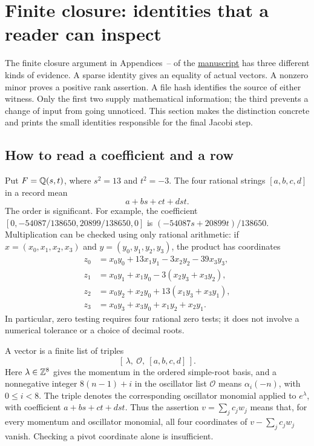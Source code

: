 \section{Finite closure: identities that a reader can inspect}
\label{sec:reader-finite}

The finite closure argument in Appendices~-- of the
\href{hi_cft_c8_proof.pdf}{manuscript} has three different kinds of
evidence.  A sparse identity gives an equality of actual vectors.  A
nonzero minor proves a positive rank assertion.  A file hash identifies
the source of either witness.  Only the first two supply mathematical
information; the third prevents a change of input from going unnoticed.
This section makes the distinction concrete and prints the small
identities responsible for the final Jacobi step.

\subsection{How to read a coefficient and a row}

Put $F=\mathbb Q(s,t)$, where $s^2=13$ and $t^2=-3$.  The four rational
strings $[a,b,c,d]$ in a record mean
\[
                  a+bs+ct+dst.
\]
The order is significant.  For example, the coefficient
$[0,-54087/138650,20899/138650,0]$ is
$(-54087s+20899t)/138650$.  Multiplication can be checked using
only rational arithmetic: if $x=(x_0,x_1,x_2,x_3)$ and
$y=(y_0,y_1,y_2,y_3)$, the product has coordinates
\begin{align*}
z_0&=x_0y_0+13x_1y_1-3x_2y_2-39x_3y_3,\\
z_1&=x_0y_1+x_1y_0-3(x_2y_3+x_3y_2),\\
z_2&=x_0y_2+x_2y_0+13(x_1y_3+x_3y_1),\\
z_3&=x_0y_3+x_3y_0+x_1y_2+x_2y_1.
\end{align*}
In particular, zero testing requires four rational zero tests; it
does not involve a numerical tolerance or a choice of decimal roots.

A vector is a finite list of triples
\[
       [\,\lambda,\ \mathcal O,\ [a,b,c,d]\,].
\]
Here $\lambda\in\mathbb Z^8$ gives the momentum in the ordered simple-root
basis, and a nonnegative integer $8(n-1)+i$ in the oscillator list
$\mathcal O$ means $\alpha_i(-n)$, with $0\leq i<8$.
The triple denotes the corresponding oscillator monomial applied to
$e^\lambda$, with coefficient $a+bs+ct+dst$.
Thus the assertion $v=\sum_jc_jw_j$ means that, for every momentum
and oscillator monomial, all four coordinates of
$v-\sum_jc_jw_j$ vanish.  Checking a pivot coordinate alone is
insufficient.

